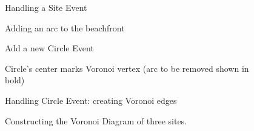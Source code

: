 \documentclass[12pt,twoside]{reedthesis}
\begin{document}
    \begin{figure}[!htb]
      \centering
      \begin{subtable}{0.475\textwidth}
        \centering
        
        \caption{Handling a Site Event}
        \label{fig:fortune_0}
      \end{subtable}%
      \begin{subtable}{0.475\textwidth}
        \centering
        
        \caption{Adding an arc to the beachfront}
        \label{fig:fortune_1}
      \end{subtable}
      \begin{subtable}{0.475\textwidth}
        \centering
        
        \caption{Add a new Circle Event}
        \label{fig:fortune_2}
      \end{subtable}
      \begin{subtable}{0.475\textwidth}
        \centering
        
        \caption{Circle's center marks Voronoi vertex (arc to be removed shown in bold)}
        \label{fig:fortune_3}
      \end{subtable}
      \begin{subtable}{0.475\textwidth}
        \centering
        
        \caption{Handling Circle Event: creating Voronoi edges}
        \label{fig:fortune_done}
      \end{subtable}
      \caption{Constructing the Voronoi Diagram of three sites.}
      \label{fig:construct_vorof_3}
    \end{figure}
\end{document}
